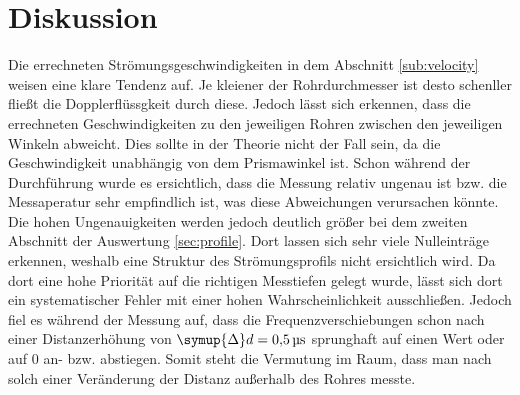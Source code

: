 \section{Diskussion}
\label{sec:Diskussion}
Die errechneten Strömungsgeschwindigkeiten in dem Abschnitt \ref{sub:velocity} weisen eine klare Tendenz auf.
Je kleiener der Rohrdurchmesser ist desto schenller fließt die Dopplerflüssgkeit durch diese.
Jedoch lässt sich erkennen, dass die errechneten Geschwindigkeiten zu den jeweiligen Rohren zwischen den jeweiligen
Winkeln abweicht.
Dies sollte in der Theorie nicht der Fall sein, da die Geschwindigkeit unabhängig von dem Prismawinkel ist.
Schon während der Durchführung wurde es ersichtlich, dass die Messung relativ ungenau ist bzw. die Messaperatur sehr empfindlich ist,
was diese Abweichungen verursachen könnte.
Die hohen Ungenauigkeiten werden jedoch deutlich größer bei dem zweiten Abschnitt der Auswertung \ref{sec:profile}.
Dort lassen sich sehr viele Nulleinträge erkennen, weshalb eine Struktur des Strömungsprofils nicht ersichtlich wird.
Da dort eine hohe Priorität auf die richtigen Messtiefen gelegt wurde, lässt sich dort ein systematischer Fehler
mit einer hohen Wahrscheinlichkeit ausschließen. 
Jedoch fiel es während der Messung auf, dass die Frequenzverschiebungen schon nach einer Distanzerhöhung von $\symup{\Delta} d = \SI{0.5}{\micro\second}$
sprunghaft auf einen Wert oder auf 0 an- bzw. abstiegen. 
Somit steht die Vermutung im Raum, dass man nach solch einer Veränderung der Distanz außerhalb  des Rohres messte.